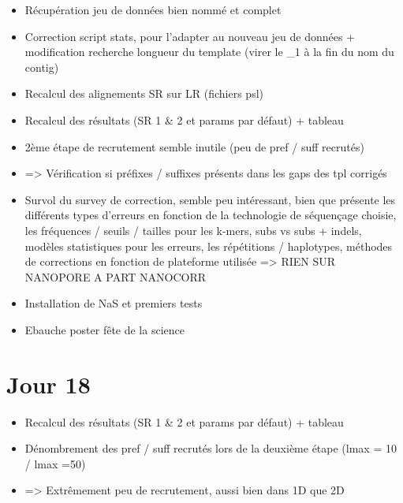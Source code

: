 \documentclass[12pt]{report}
\begin{document}
\begin{itemize}
  \item Récupération jeu de données bien nommé et complet

  \item Correction script stats, pour l'adapter au nouveau jeu de données + modification recherche longueur du template (virer le \_1 à la fin du nom du contig)

  \item Recalcul des alignements SR sur LR (fichiers psl)

  \item Recalcul des résultats (SR 1 \& 2 et params par défaut) + tableau

  \item 2ème étape de recrutement semble inutile (peu de pref / suff recrutés)

  \item => Vérification si préfixes / suffixes présents dans les gaps des tpl corrigés

  \item Survol du survey de correction, semble peu intéressant, bien que présente les différents types d'erreurs en fonction de la technologie de séquençage choisie, les fréquences / seuils / tailles pour les k-mers, subs vs subs + indels, modèles statistiques pour les erreurs, les répétitions / haplotypes, méthodes de corrections en fonction de plateforme utilisée => RIEN SUR NANOPORE A PART NANOCORR

  \item Installation de NaS et premiers tests

  \item Ebauche poster fête de la science
\end{itemize}

\section{Jour 18}

\begin{itemize}
  \item Recalcul des résultats (SR 1 \& 2 et params par défaut) + tableau

  \item Dénombrement des pref / suff recrutés lors de la deuxième étape (lmax = 10 / lmax =50)

  \item => Extrêmement peu de recrutement, aussi bien dans 1D que 2D
\end{itemize}
\end{document}
